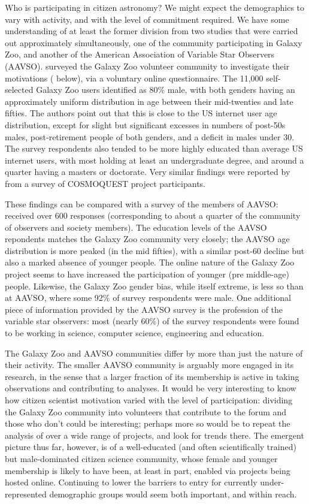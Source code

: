 \documentclass{ar2e}
\begin{document}
Who is participating in citizen astronomy? We might expect the demographics to
vary with activity, and with the level of commitment required. We have some
understanding of at least the former division from two studies that were
carried out approximately simultaneously, one of the community  participating
in Galaxy Zoo, and another of the  American Association of Variable Star
Observers (AAVSO).  \citet{Rad++13} surveyed the Galaxy Zoo volunteer
community to investigate their motivations (
below), via a voluntary online questionnaire. The 11,000 self-selected Galaxy
Zoo users identified as 80\% male, with both genders having an approximately
uniform distribution in age between their mid-twenties and late fifties. The
authors point out that this is close to the US internet user age distribution,
except for slight but significant excesses in numbers of post-50s males,
post-retirement people of both genders, and a deficit in males under 30. The
survey respondents  also tended to be more highly educated than average US
internet users, with most holding at least an undergraduate degree, and around
a quarter having a masters or doctorate. Very similar findings were reported
by \citet{COSMOQUESTsurvey} from a survey of COSMOQUEST project participants.

These findings can be compared with a survey of the members of AAVSO:
\citet{P+P2012} received over 600 responses  (corresponding to about a quarter
of the community of observers and society members). The education levels of
the AAVSO repondents matches the Galaxy Zoo community very closely; the AAVSO
age distribution is more peaked (in the mid fifties), with a similar post-60
decline but also a marked absence of younger people. The online nature of the
Galaxy Zoo project seems to have increased the participation of younger (pre
middle-age) people. Likewise, the Galaxy Zoo gender bias, while itself
extreme, is less so than at AAVSO, where some 92\% of survey respondents were
male. One additional piece of information provided by the AAVSO survey is the
profession of the variable star observers: most (nearly 60\%) of the survey
respondents were found to be working in science, computer science, engineering
and education.

The Galaxy Zoo and AAVSO communities differ by more than just the nature of
their activity. The smaller AAVSO community is arguably more engaged in its
research, in the sense that a larger fraction of its membership is active in
taking observations and contributing to analyses. It would be very interesting
to know how citizen scientist motivation varied with the level of
participation: dividing the Galaxy Zoo community into volunteers that
contribute to the  forum and those who don't could be interesting; perhaps
more so would be to repeat the analysis of \citeauthor{Rad++2013} over a wide
range of projects, and look for trends there. The emergent picture thus far,
however, is of a well-educated (and often scientifically trained)  but
male-dominated citizen science community, whose female and younger membership
is likely to have been, at least in part, enabled via projects being hosted
online. Continuing to lower the barriers to entry for currently
under-represented demographic groups would seem both important, and within
reach.
\end{document}
